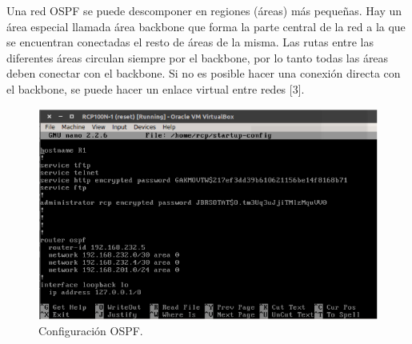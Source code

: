 Una red OSPF se puede descomponer en regiones (áreas) más pequeñas. Hay un área especial llamada área backbone que forma la parte central de la red a la que se encuentran conectadas el resto de áreas de la misma. Las rutas entre las diferentes áreas circulan siempre por el backbone, por lo tanto todas las áreas deben conectar con el backbone. Si no es posible hacer una conexión directa con el backbone, se puede hacer un enlace virtual entre redes [3].
\FloatBarrier
\begin{figure}[htbp!]
		\centering
			\includegraphics[width=.8 \textwidth]{images/ospf}
		\caption{Configuración OSPF.}
		\label{image:ospf}
\end{figure}
\FloatBarrier